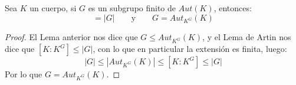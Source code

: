 \begin{teo}\label{teo:antes_teo_angular}
    Sea $K$ un cuerpo, si $G$ es un subgrupo finito de $Aut(K)$, entonces:
    \begin{equation*}
        [K:K^G] = |G| \qquad \text{y}\qquad G = Aut_{K^G}(K)
    \end{equation*}
    \begin{proof}
        El Lema anterior nos dice que $G\leq Aut_{K^G}(K)$, y el Lema de Artin nos dice que $[K:K^G]\leq |G|$, con lo que en particular la extensión es finita, luego:
        \begin{equation*}
            |G| \leq |Aut_{K^G}(K)| \leq [K:K^G] \leq |G|
        \end{equation*}
        Por lo que $G = Aut_{K^G}(K)$.
    \end{proof}
\end{teo}


